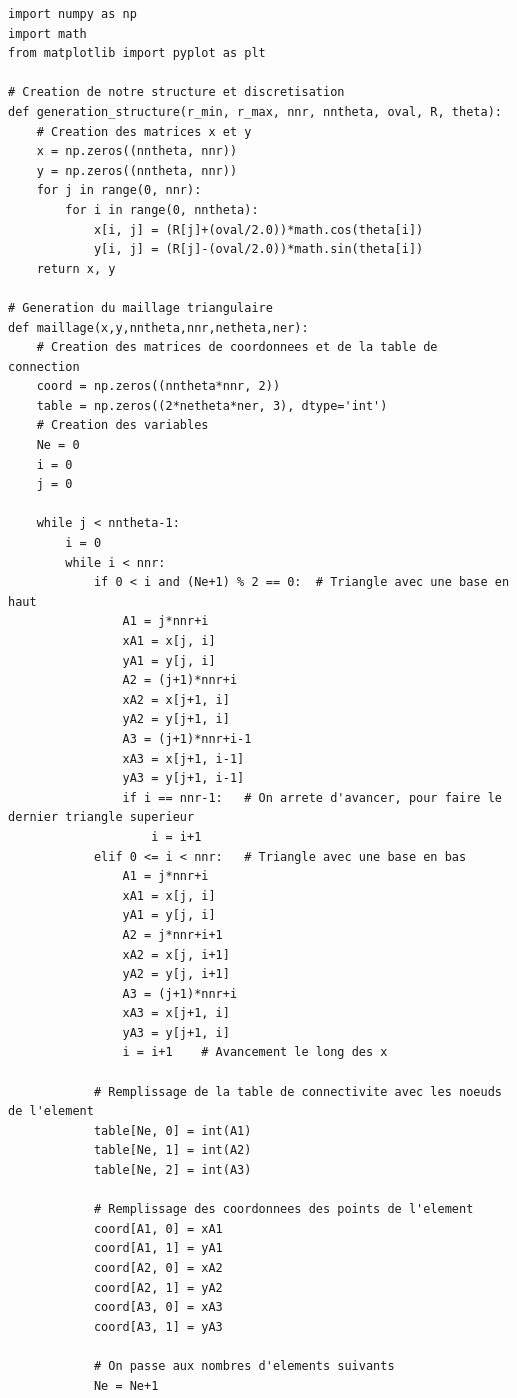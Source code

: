 \documentclass[a4paper,11pt]{report}    %
\newenvironment{longlisting}{\captionsetup{type=listing}}{} %
\begin{document}
\begin{longlisting}
\begin{verbatim}
import numpy as np
import math
from matplotlib import pyplot as plt

# Creation de notre structure et discretisation
def generation_structure(r_min, r_max, nnr, nntheta, oval, R, theta):
    # Creation des matrices x et y
    x = np.zeros((nntheta, nnr))
    y = np.zeros((nntheta, nnr))
    for j in range(0, nnr):
        for i in range(0, nntheta):
            x[i, j] = (R[j]+(oval/2.0))*math.cos(theta[i])
            y[i, j] = (R[j]-(oval/2.0))*math.sin(theta[i])
    return x, y

# Generation du maillage triangulaire
def maillage(x,y,nntheta,nnr,netheta,ner):
    # Creation des matrices de coordonnees et de la table de connection
    coord = np.zeros((nntheta*nnr, 2))
    table = np.zeros((2*netheta*ner, 3), dtype='int')
    # Creation des variables
    Ne = 0
    i = 0
    j = 0

    while j < nntheta-1:
        i = 0
        while i < nnr:
            if 0 < i and (Ne+1) % 2 == 0:  # Triangle avec une base en haut
                A1 = j*nnr+i
                xA1 = x[j, i]
                yA1 = y[j, i]
                A2 = (j+1)*nnr+i
                xA2 = x[j+1, i]
                yA2 = y[j+1, i]
                A3 = (j+1)*nnr+i-1
                xA3 = x[j+1, i-1]
                yA3 = y[j+1, i-1]
                if i == nnr-1:   # On arrete d'avancer, pour faire le dernier triangle superieur
                    i = i+1
            elif 0 <= i < nnr:   # Triangle avec une base en bas
                A1 = j*nnr+i
                xA1 = x[j, i]
                yA1 = y[j, i]
                A2 = j*nnr+i+1
                xA2 = x[j, i+1]
                yA2 = y[j, i+1]
                A3 = (j+1)*nnr+i
                xA3 = x[j+1, i]
                yA3 = y[j+1, i]
                i = i+1    # Avancement le long des x

            # Remplissage de la table de connectivite avec les noeuds de l'element
            table[Ne, 0] = int(A1)
            table[Ne, 1] = int(A2)
            table[Ne, 2] = int(A3)

            # Remplissage des coordonnees des points de l'element
            coord[A1, 0] = xA1
            coord[A1, 1] = yA1
            coord[A2, 0] = xA2
            coord[A2, 1] = yA2
            coord[A3, 0] = xA3
            coord[A3, 1] = yA3

            # On passe aux nombres d'elements suivants
            Ne = Ne+1


\end{verbatim}
\end{longlisting}
\end{document}
